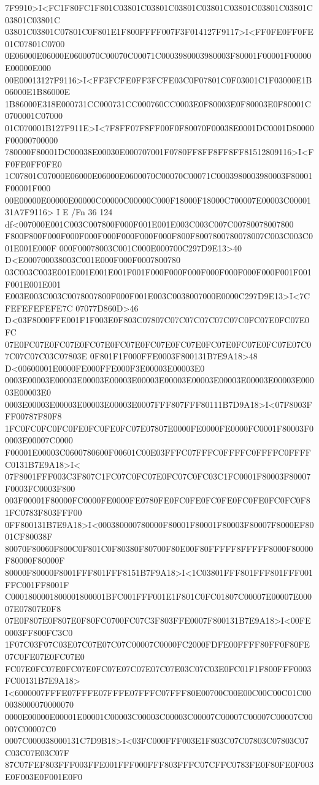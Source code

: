 7F9910>I<FC1F80FC1F801C03801C03801C03801C03801C03801C03801C03801C03801C03801C
03801C03801C07801C0F801E1F800FFFF007F3F014127F9117>I<FF0FE0FF0FE01C07801C0700
0E06000E06000E0600070C00070C00071C0003980003980003F80001F00001F00000E00000E000
00E00013127F9116>I<FF3FCFE0FF3FCFE03C0F07801C0F03001C1F03000E1B06000E1B86000E
1B86000E318E000731CC000731CC000760CC0003E0F80003E0F80003E0F80001C0700001C07000
01C070001B127F911E>I<7F8FF07F8FF00F0F80070F00038E0001DC0001D80000F00000700000
780000F80001DC00038E00030E000707001F0780FF8FF8FF8FF81512809116>I<FF0FE0FF0FE0
1C07801C07000E06000E06000E0600070C00070C00071C0003980003980003F80001F00001F000
00E00000E00000E00000C00000C00000C000F18000F18000C700007E00003C0000131A7F9116>
I E /Fn 36 124 df<007000E001C003C007800F000F001E001E003C003C007C00780078007800
F800F800F000F000F000F000F000F000F000F800F8007800780078007C003C003C001E001E000F
000F00078003C001C000E000700C297D9E13>40 D<E000700038003C001E000F000F0007800780
03C003C003E001E001E001E001F001F000F000F000F000F000F000F000F001F001F001E001E001
E003E003C003C0078007800F000F001E003C0038007000E0000C297D9E13>I<7CFEFEFEFEFE7C
07077D860D>46 D<03F8000FFE001F1F003E0F803C07807C07C07C07C07C07C0FC07E0FC07E0FC
07E0FC07E0FC07E0FC07E0FC07E0FC07E0FC07E0FC07E0FC07E0FC07E07C07C07C07C03C07803E
0F801F1F000FFE0003F800131B7E9A18>48 D<00600001E0000FE000FFE000F3E00003E00003E0
0003E00003E00003E00003E00003E00003E00003E00003E00003E00003E00003E00003E00003E0
0003E00003E00003E00003E00003E0007FFF807FFF80111B7D9A18>I<07F8003FFF00787F80F8
1FC0FC0FC0FC0FE0FC0FE0FC07E07807E0000FE0000FE0000FC0001F80003F00003E00007C0000
F00001E00003C0600780600F00601C00E03FFFC07FFFC0FFFFC0FFFFC0FFFFC0131B7E9A18>I<
07F8001FFF003C3F807C1FC07C0FC07E0FC07C0FC03C1FC0001F80003F80007F0003FC0003F800
003F00001F80000FC0000FE0000FE0780FE0FC0FE0FC0FE0FC0FE0FC0FC0F81FC0783F803FFF00
0FF800131B7E9A18>I<000380000780000F80001F80001F80003F80007F8000EF8001CF80038F
80070F80060F800C0F801C0F80380F80700F80E00F80FFFFF8FFFFF8000F80000F80000F80000F
80000F80000F8001FFF801FFF8151B7F9A18>I<1C03801FFF801FFF801FFF001FFC001FF8001F
C0001800001800001800001BFC001FFF001E1F801C0FC01807C00007E00007E00007E07807E0F8
07E0F807E0F807E0F80FC0700FC07C3F803FFE0007F800131B7E9A18>I<00FE0003FF800FC3C0
1F07C03F07C03E07C07E07C07C00007C0000FC2000FDFE00FFFF80FF0F80FE07C0FE07E0FC07E0
FC07E0FC07E0FC07E0FC07E07C07E07C07E03C07C03E0FC01F1F800FFF0003FC00131B7E9A18>
I<6000007FFFE07FFFE07FFFE07FFFC07FFF80E00700C00E00C00C00C01C000038000070000070
0000E00000E00001E00001C00003C00003C00003C00007C00007C00007C00007C00007C00007C0
0007C000038000131C7D9B18>I<03FC000FFF003E1F803C07C07803C07803C07C03C07E03C07F
87C07FEF803FFF003FFE001FFF000FFF803FFFC07CFFC0783FE0F80FE0F003E0F003E0F001E0F0
